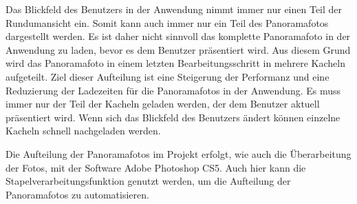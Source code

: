 Das Blickfeld des Benutzers in der Anwendung nimmt immer nur einen Teil der
Rundumansicht ein. Somit kann auch immer nur ein Teil des Panoramafotos
dargestellt werden. Es ist daher nicht sinnvoll das komplette Panoramafoto in
der Anwendung zu laden, bevor es dem Benutzer präsentiert wird.
Aus diesem Grund wird das Panoramafoto in einem letzten Bearbeitungsschritt in
mehrere Kacheln aufgeteilt. Ziel dieser Aufteilung ist eine Steigerung der
Performanz und eine Reduzierung der Ladezeiten für die Panoramafotos in der
Anwendung. Es muss immer nur der Teil der Kacheln geladen werden, der dem
Benutzer aktuell präsentiert wird. Wenn sich das Blickfeld des Benutzers ändert
können einzelne Kacheln schnell nachgeladen werden.

Die Aufteilung der Panoramafotos im Projekt erfolgt, wie auch die Überarbeitung
der Fotos, mit der Software Adobe Photoshop CS5. Auch hier kann die
Stapelverarbeitungsfunktion genutzt werden, um die Aufteilung der Panoramafotos
zu automatisieren.

